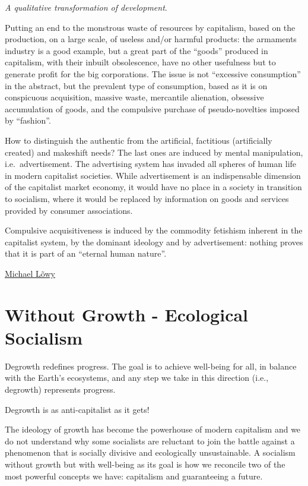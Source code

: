 \documentclass[
]{book}
\begin{document}
\emph{A qualitative transformation of development}.

Putting an end to the monstrous waste of resources by capitalism, based on the production, on a large scale, of useless and/or harmful products: the armaments industry is a good example, but a great part of the ``goods'' produced in capitalism, with their inbuilt obsolescence, have no other usefulness but to generate profit for the big corporations. The issue is not ``excessive consumption'' in the abstract, but the prevalent type of consumption, based as it is on conspicuous acquisition, massive waste, mercantile alienation, obsessive accumulation of goods, and the compulsive purchase of pseudo-novelties imposed by ``fashion''.

How to distinguish the authentic from the artificial, factitious (artificially created) and makeshift needs? The last ones are induced by mental manipulation, i.e.~advertisement. The advertising system has invaded all spheres of human life in modern capitalist societies.
While advertisement is an indispensable dimension of the capitalist market economy, it would have no place in a society in transition to socialism, where it would be replaced by information on goods and services provided by consumer associations.

Compulsive acquisitiveness is induced by the commodity fetishism inherent in the capitalist system, by the dominant ideology and by advertisement: nothing proves that it is part of an ``eternal human nature''.

\href{https://www.letusrise.ie/rupture-articles/2wl71srdonxrbgxal9v6bv78njr2fb}{Michael Lõwy}

\hypertarget{without-growth---ecological-socialism}{%
\section{Without Growth - Ecological Socialism}\label{without-growth---ecological-socialism}}

Degrowth redefines progress.
The goal is to achieve well-being for all,
in balance with the Earth's ecosystems,
and any step we take in this direction (i.e., degrowth) represents progress.

Degrowth is as anti-capitalist as it gets!

The ideology of growth has become the powerhouse of modern capitalism and we do not understand why some socialists are reluctant to join the battle against a phenomenon that is socially divisive and ecologically unsustainable. A socialism without growth but with well-being as its goal is how we reconcile two of the most powerful concepts we have: capitalism and guaranteeing a future.
\end{document}
